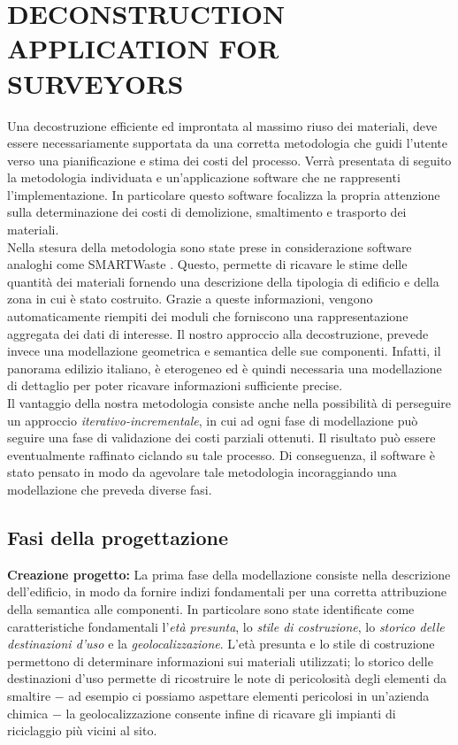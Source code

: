 \section{\uppercase{Deconstruction Application for surveyors}}
\label{sec:application}

\noindent Una decostruzione efficiente ed improntata al massimo riuso dei materiali, deve essere necessariamente supportata da una corretta metodologia che guidi l'utente verso una pianificazione e stima dei costi del processo. Verr\`a presentata di seguito la metodologia individuata e un'applicazione software che ne rappresenti l'implementazione. In particolare questo software focalizza la propria attenzione sulla determinazione dei costi di demolizione, smaltimento e trasporto dei materiali.\\

\noindent Nella stesura della metodologia sono state prese in considerazione software analoghi come SMARTWaste \cite{SMARTWaste}. Questo, permette di ricavare le stime delle quantit\`a dei materiali fornendo una descrizione della tipologia di edificio e della zona in cui \`e stato costruito. Grazie a queste informazioni, vengono automaticamente riempiti dei moduli che forniscono una rappresentazione aggregata dei dati di interesse. Il nostro approccio alla decostruzione, prevede invece una modellazione geometrica e semantica delle sue componenti. Infatti, il panorama edilizio italiano, \`e eterogeneo ed \`e quindi necessaria una modellazione di dettaglio per poter ricavare informazioni sufficiente precise.\\

\noindent Il vantaggio della nostra metodologia consiste anche nella possibilit\`a di perseguire un approccio \textit{iterativo-incrementale}, in cui ad ogni fase di modellazione pu\`o seguire una fase di validazione dei costi parziali ottenuti. Il risultato pu\`o essere eventualmente raffinato ciclando su tale processo. Di conseguenza, il software \`e stato pensato in modo da agevolare tale metodologia incoraggiando una modellazione che preveda diverse fasi.\\

\subsection{Fasi della progettazione}

\noindent \textbf{Creazione progetto:} La prima fase della modellazione consiste nella descrizione dell'edificio, in modo da fornire indizi fondamentali per una corretta attribuzione della semantica alle componenti. In particolare sono state identificate come caratteristiche fondamentali l'\textit{et\`a presunta}, lo \textit{stile di costruzione}, lo \textit{storico delle destinazioni d'uso} e la \textit{geolocalizzazione}. L'et\`a presunta e lo stile di costruzione permettono di determinare informazioni sui materiali utilizzati; lo storico delle destinazioni d'uso permette di ricostruire le note di pericolosit\`a degli elementi da smaltire $-$ ad esempio ci possiamo aspettare elementi pericolosi in un'azienda chimica $-$ la geolocalizzazione consente infine di ricavare gli impianti di riciclaggio pi\`u vicini al sito.\\

